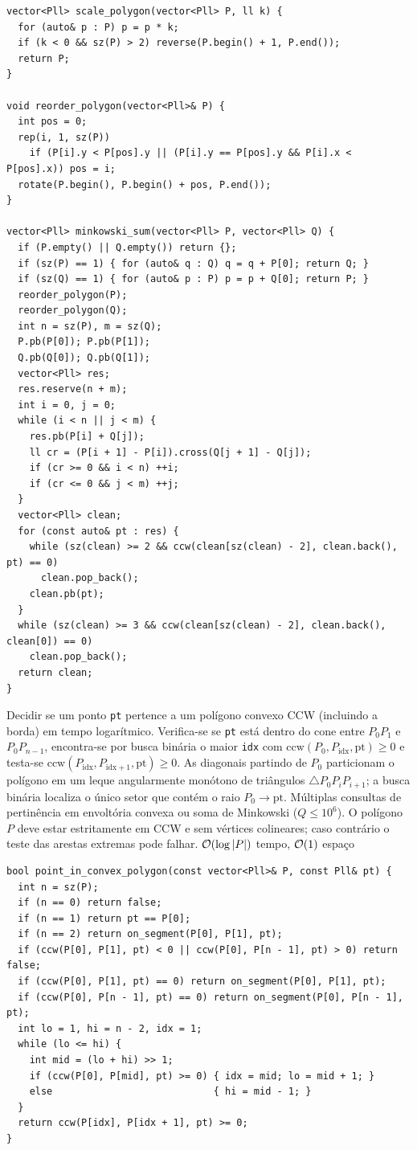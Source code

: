 \begin{lstlisting}
vector<Pll> scale_polygon(vector<Pll> P, ll k) {
  for (auto& p : P) p = p * k;
  if (k < 0 && sz(P) > 2) reverse(P.begin() + 1, P.end());
  return P;
}

void reorder_polygon(vector<Pll>& P) {
  int pos = 0;
  rep(i, 1, sz(P))
    if (P[i].y < P[pos].y || (P[i].y == P[pos].y && P[i].x < P[pos].x)) pos = i;
  rotate(P.begin(), P.begin() + pos, P.end());
}

vector<Pll> minkowski_sum(vector<Pll> P, vector<Pll> Q) {
  if (P.empty() || Q.empty()) return {};
  if (sz(P) == 1) { for (auto& q : Q) q = q + P[0]; return Q; }
  if (sz(Q) == 1) { for (auto& p : P) p = p + Q[0]; return P; }
  reorder_polygon(P);
  reorder_polygon(Q);
  int n = sz(P), m = sz(Q);
  P.pb(P[0]); P.pb(P[1]);
  Q.pb(Q[0]); Q.pb(Q[1]);
  vector<Pll> res;
  res.reserve(n + m);
  int i = 0, j = 0;
  while (i < n || j < m) {
    res.pb(P[i] + Q[j]);
    ll cr = (P[i + 1] - P[i]).cross(Q[j + 1] - Q[j]);
    if (cr >= 0 && i < n) ++i;
    if (cr <= 0 && j < m) ++j;
  }
  vector<Pll> clean;
  for (const auto& pt : res) {
    while (sz(clean) >= 2 && ccw(clean[sz(clean) - 2], clean.back(), pt) == 0)
      clean.pop_back();
    clean.pb(pt);
  }
  while (sz(clean) >= 3 && ccw(clean[sz(clean) - 2], clean.back(), clean[0]) == 0)
    clean.pop_back();
  return clean;
}
\end{lstlisting}

\algobox
  {Decidir se um ponto \texttt{pt} pertence a um polígono convexo CCW (incluindo a borda) em tempo logarítmico.}
  {Verifica-se se \texttt{pt} está dentro do cone entre $P_0 P_1$ e $P_0 P_{n-1}$, encontra-se por busca binária o maior \texttt{idx} com $\text{ccw}(P_0, P_{\text{idx}}, \text{pt}) \ge 0$ e testa-se $\text{ccw}(P_{\text{idx}}, P_{\text{idx}+1}, \text{pt}) \ge 0$.}
  {As diagonais partindo de $P_0$ particionam o polígono em um leque angularmente monótono de triângulos $\triangle P_0 P_i P_{i+1}$; a busca binária localiza o único setor que contém o raio $P_0 \to \text{pt}$.}
  {Múltiplas consultas de pertinência em envoltória convexa ou soma de Minkowski ($Q \le 10^6$).}
  {O polígono $P$ deve estar estritamente em CCW e sem vértices colineares; caso contrário o teste das arestas extremas pode falhar.}
  {$\mathcal{O}(\log |P|)$ tempo, $\mathcal{O}(1)$ espaço}

\begin{lstlisting}
bool point_in_convex_polygon(const vector<Pll>& P, const Pll& pt) {
  int n = sz(P);
  if (n == 0) return false;
  if (n == 1) return pt == P[0];
  if (n == 2) return on_segment(P[0], P[1], pt);
  if (ccw(P[0], P[1], pt) < 0 || ccw(P[0], P[n - 1], pt) > 0) return false;
  if (ccw(P[0], P[1], pt) == 0) return on_segment(P[0], P[1], pt);
  if (ccw(P[0], P[n - 1], pt) == 0) return on_segment(P[0], P[n - 1], pt);
  int lo = 1, hi = n - 2, idx = 1;
  while (lo <= hi) {
    int mid = (lo + hi) >> 1;
    if (ccw(P[0], P[mid], pt) >= 0) { idx = mid; lo = mid + 1; }
    else                            { hi = mid - 1; }
  }
  return ccw(P[idx], P[idx + 1], pt) >= 0;
}
\end{lstlisting}

